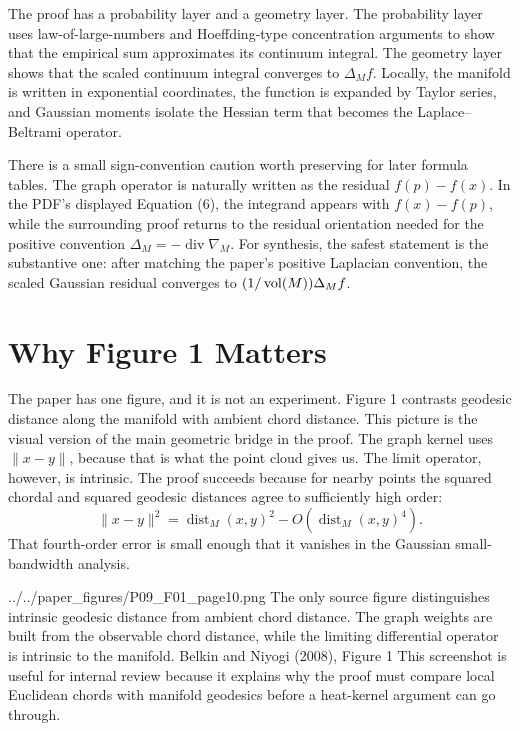 \documentclass[11pt]{article}
\begin{document}
The proof has a probability layer and a geometry layer. The probability layer
uses law-of-large-numbers and Hoeffding-type concentration arguments to show
that the empirical sum approximates its continuum integral. The geometry layer
shows that the scaled continuum integral converges to \(\Delta_M f\). Locally,
the manifold is written in exponential coordinates, the function is expanded
by Taylor series, and Gaussian moments isolate the Hessian term that becomes
the Laplace--Beltrami operator.

There is a small sign-convention caution worth preserving for later formula
tables. The graph operator is naturally written as the residual
\(f(p)-f(x)\). In the PDF's displayed Equation (6), the integrand appears with
\(f(x)-f(p)\), while the surrounding proof returns to the residual orientation
needed for the positive convention \(\Delta_M=-\operatorname{div}\nabla_M\).
For synthesis, the safest statement is the substantive one: after matching the
paper's positive Laplacian convention, the scaled Gaussian residual converges
to \((1/\operatorname{vol}(M))\Delta_M f\).

\section{Why Figure 1 Matters}

The paper has one figure, and it is not an experiment. Figure 1 contrasts
geodesic distance along the manifold with ambient chord distance. This picture
is the visual version of the main geometric bridge in the proof. The graph
kernel uses \(\|x-y\|\), because that is what the point cloud gives us. The
limit operator, however, is intrinsic. The proof succeeds because for nearby
points the squared chordal and squared geodesic distances agree to sufficiently
high order:
\[
  \|x-y\|^2
  =
  \operatorname{dist}_M(x,y)^2
  -
  O\!\left(\operatorname{dist}_M(x,y)^4\right).
\]
That fourth-order error is small enough that it vanishes in the Gaussian
small-bandwidth analysis.

\paperfigure
  {../../paper_figures/P09_F01_page10.png}
  {The only source figure distinguishes intrinsic geodesic distance from
  ambient chord distance. The graph weights are built from the observable
  chord distance, while the limiting differential operator is intrinsic to the
  manifold.}
  {Belkin and Niyogi (2008), Figure 1}
  {This screenshot is useful for internal review because it explains why the
  proof must compare local Euclidean chords with manifold geodesics before a
  heat-kernel argument can go through.}
\end{document}
